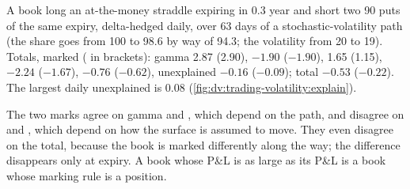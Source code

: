 \begin{example}\label{ex:dv:trading-volatility:book}
A book long an at-the-money straddle expiring in 0.3 year and short two 90 puts of the same expiry, delta-hedged daily, over 63 days of a
stochastic-volatility path (the share goes from 100 to 98.6 by way of 94.3; the volatility from 20 to 19). Totals, marked  ( in brackets): gamma 2.87 (2.90),  $-1.90$ ($-1.90$),  1.65 (1.15),  $-2.24$ ($-1.67$),  $-0.76$ ($-0.62$), unexplained
$-0.16$ ($-0.09$); total $-0.53$ ($-0.22$). The largest daily unexplained is 0.08
(\cref{fig:dv:trading-volatility:explain}).
\end{example}

The two marks agree on gamma and , which depend on the path, and disagree on  and , which depend on how the surface is assumed to
move. They even disagree on the total, because the book is marked differently along the way; the difference disappears only at expiry. A book
whose  P\&L is as large as its  P\&L is a book whose marking rule is a position.

